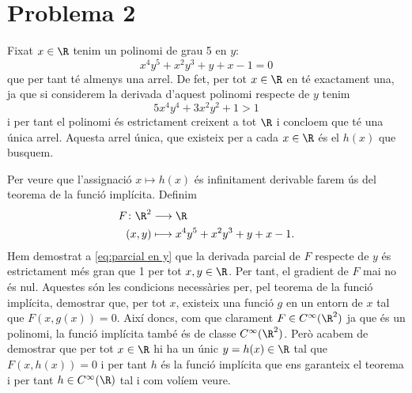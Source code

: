 \section*{Problema 2}
Fixat \( x \in \R \) tenim un polinomi de grau 5 en \( y \):
\begin{equation}
	x^4y^5 + x^2y^3 + y + x-1 = 0 \label{eq:polinomi en y}
\end{equation}
que per tant té almenys una arrel. De fet, per tot \( x \in \R \) en té exactament una, ja que si considerem la derivada d'aquest polinomi respecte de \( y \) tenim
\begin{equation}
	5x^4y^4 + 3x^2y^2 + 1 > 1 \label{eq:parcial en y}
\end{equation}
i per tant el polinomi és estrictament creixent a tot \( \R \) i concloem que té una única arrel. Aquesta arrel única, que existeix per a cada \( x \in \R \) és el \( h(x) \) que busquem. 

Per veure que l'assignació \( x \longmapsto h(x) \) és infinitament derivable farem ús del teorema de la funció implícita. Definim
\begin{align*}
	F \colon \R^2 & \longrightarrow \R \\
	(x,y) & \longmapsto x^4y^5 + x^2y^3 + y + x - 1.
\end{align*}
Hem demostrat a \ref{eq:parcial en y} que la derivada parcial de \( F \) respecte de \( y \) és estrictament més gran que 1 per tot \( x, y \in \R \). Per tant, el gradient de \( F \) mai no és nul. Aquestes són les condicions necessàries per, pel teorema de la funció implícita, demostrar que, per tot \( x \), existeix una funció \( g \) en un entorn de \( x \) tal que \( F(x, g(x)) = 0 \). Així doncs, com que clarament \( F \in C^{\infty}(\R^2) \) ja que és un polinomi, la funció implícita també és de classe \( C^{\infty}(\R^2) \). Però acabem de demostrar que per tot \( x \in \R \) hi ha un únic \( y = h(x) \in \R \) tal que \( F(x,h(x)) = 0 \) i per tant \( h \) és la funció implícita que ens garanteix el teorema i per tant \( h \in C^{\infty}(\R) \) tal i com volíem veure. 

